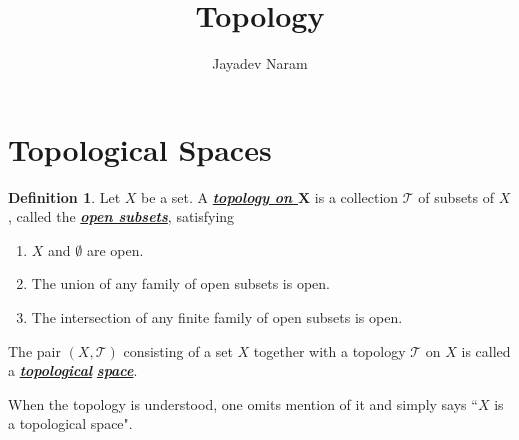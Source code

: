 \documentclass[11pt,a4paper]{article}
\author{Jayadev Naram}
\title{Topology}
\begin{document}
\date{}
\maketitle
\tableofcontents
\newpage

\theoremstyle{plain}
\newtheorem{theorem}{Theorem}[section]
\newtheorem{corollary}{Corollary}[theorem]

\newtheorem{lemma}[theorem]{Lemma}
\newtheorem{proposition}[theorem]{Proposition}
\newtheorem{assume}{Assumption}

\theoremstyle{definition}
\newtheorem{definition}[theorem]{Definition}
\newtheorem{example}[theorem]{Example}
\newtheorem{remark}[theorem]{Remark}

\newcommand{\R}{\mathbb{R}}
\newcommand{\A}{\mathcal{A}}
\newcommand{\M}{\mathcal{M}}
\newcommand{\N}{\mathcal{N}}
\newcommand{\T}{\mathcal{T}}
\newcommand{\B}{\mathcal{B}}
\newcommand{\bb}{\mathbb{B}}
\newcommand{\highlight}[1]{\underline{\textit{\textbf{#1}}}}
\newcommand{\mapping}[3]{#1:#2\rightarrow #3}
\newcommand{\doubt}{\highlight{[??]}}
\newcommand{\bigvert}[2]{\left.#1\right|_{#2}}
\newcommand{\sdnn}[1]{${#1}$}
\newcommand{\bsdnn}[1]{$\boldsymbol{#1}$}
\newcommand{\ifthen}[2]{\textbf{(#1)}\boldsymbol{\implies}\textbf{(#2)}}
\newcommand{\bsdn}[1]{\boldsymbol{#1}}
\newcommand{\forward}{$(\implies)$}
\newcommand{\converse}{$(\impliedby)$}

\section{Topological Spaces}\label{sec:top_space}

\begin{definition}\label{def:top_space}
Let $X$ be a set. A \highlight{topology on \bsdnn{X}} is a collection $\T$ of subsets of $X$, called the \highlight{open subsets}, satisfying
\begin{enumerate}
    \item $X$ and $\emptyset$ are open.
    \item The union of any family of open subsets is open.
    \item The intersection of any finite family of open subsets is open.
\end{enumerate}
The pair $(X,\T)$ consisting of a set $X$ together with a topology $\T$ on $X$ is called a \highlight{topological} \highlight{space}.
\end{definition}

When the topology is understood, one omits mention of it and simply says ``$X$ is a topological space".
\end{document}
